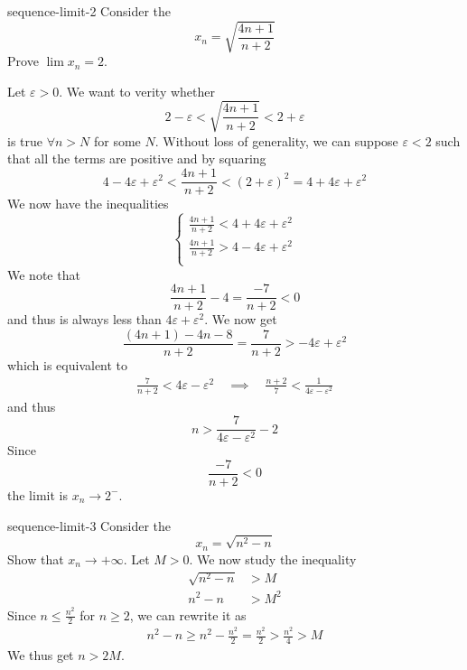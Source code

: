 \documentclass[preview]{standalone}
\begin{document}
\begin{snippetexample}{sequence-limit-2}{}
    Consider the \sequence
    \[
        x_n = \sqrt{\frac{4n+1}{n+2}}
    \]
    Prove \(\lim x_n = 2\).

    Let \(\varepsilon > 0\). We want to verity whether
    \[
        2 - \varepsilon < \sqrt{\frac{4n+1}{n+2}} < 2 + \varepsilon
    \]
    is true \(\forall n > N\) for some \(N\).
    Without loss of generality, we can suppose \(\varepsilon < 2\)
    such that all the terms are positive and by squaring
    \[
        4-4\varepsilon + \varepsilon^2 < \frac{4n + 1}{n+2} < {(2 + \varepsilon)}^2 = 4 + 4\varepsilon + \varepsilon^2
    \]
    We now have the inequalities
    \[
        \begin{cases}
            \frac{4n + 1}{n+2} < 4 + 4\varepsilon + \varepsilon^2 \\
            \frac{4n + 1}{n+2} > 4 - 4\varepsilon + \varepsilon^2 \\
        \end{cases}
    \]
    We note that
    \[
        \frac{4n + 1}{n+2} - 4 = \frac{-7}{n+2} < 0
    \]
    and thus is always less than \(4\varepsilon + \varepsilon^2\).
    We now get
    \[
        \frac{(4n + 1) - 4n - 8}{n+2} = \frac{7}{n + 2} > -4\varepsilon + \varepsilon^2
    \]
    which is equivalent to
    \begin{align*}
        \frac{7}{n+2} < 4\varepsilon - \varepsilon^2 \quad \implies \quad
        \frac{n+2}{7} < \frac{1}{4\varepsilon - \varepsilon^2}
    \end{align*}
    and thus
    \[
        n > \frac{7}{4\varepsilon - \varepsilon^2} - 2
    \]
    Since \[
        \frac{-7}{n+2} < 0
    \]
    the limit is \(x_n \to 2^-\).
\end{snippetexample}


\begin{snippetexample}{sequence-limit-3}{}
    Consider the \sequence
    \[
        x_n = \sqrt{n^2 - n}
    \]
    Show that \(x_n \to +\infty \).
    Let \(M > 0\). We now study the inequality
    \begin{align*}
        \sqrt{n^2 - n} &> M \\
        n^2 - n &> M^2
    \end{align*}
    Since \(n \leq \frac{n^2}{2}\) for \(n \geq 2\), we can rewrite it as
    \begin{align*}
        n^2 - n \geq n^2 - \frac{n^2}{2} = \frac{n^2}{2} > \frac{n^2}{4} > M
    \end{align*}
    We thus get \(n > 2M\).
\end{snippetexample}
\end{document}
